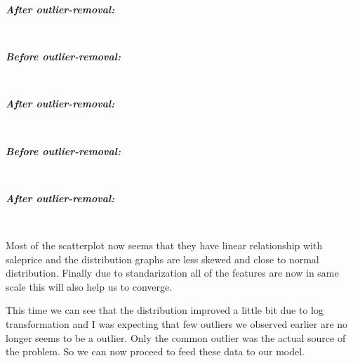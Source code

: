 \documentclass[11pt, a4paper , landscape]{article}
\begin{document}
    \textbf{\emph{After outlier-removal:}}

    
    \begin{center}
    \end{center}
    { \hspace*{\fill} \\}
    
    \textbf{\emph{Before outlier-removal:}}

    
    \begin{center}
    \end{center}
    { \hspace*{\fill} \\}
    
    \textbf{\emph{After outlier-removal:}}

    
    \begin{center}
    \end{center}
    { \hspace*{\fill} \\}
    
    \textbf{\emph{Before outlier-removal:}}

    
    \begin{center}
    \end{center}
    { \hspace*{\fill} \\}
    
    \textbf{\emph{After outlier-removal:}}

    
    \begin{center}
    \end{center}
    { \hspace*{\fill} \\}
    
    Most of the scatterplot now seems that they have linear relationship
with saleprice and the distribution graphs are less skewed and close to
normal distribution. Finally due to standarization all of the features
are now in same scale this will also help us to converge.

This time we can see that the distribution improved a little bit due to
log transformation and I was expecting that few outliers we observed
earlier are no longer seems to be a outlier. Only the common outlier was
the actual source of the problem. So we can now proceed to feed these
data to our model.
\end{document}
